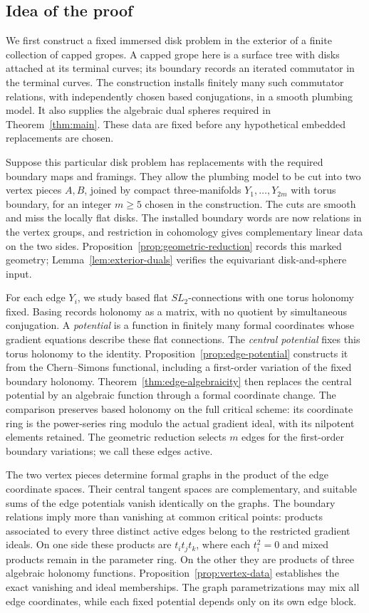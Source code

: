 \subsection{Idea of the proof}

We first construct a fixed immersed disk problem in the exterior of a
finite collection of capped gropes. A capped grope here is a surface tree
with disks attached at its terminal curves; its boundary records an
iterated commutator in the terminal curves. The construction installs
finitely many such commutator relations, with independently chosen based
conjugations, in a smooth plumbing model. It also supplies the algebraic
dual spheres required in Theorem~\ref{thm:main}. These data are fixed
before any hypothetical embedded replacements are chosen.

Suppose this particular disk problem has replacements with the required
boundary maps and framings. They allow the plumbing model to be cut into
two vertex pieces \(A,B\), joined by compact three-manifolds
\(Y_1,\ldots,Y_{2m}\) with torus boundary, for an integer \(m\geq5\)
chosen in the construction. The cuts are smooth and miss
the locally flat disks. The installed boundary words are now relations
in the vertex groups, and restriction in cohomology gives complementary
linear data on the two sides. Proposition~\ref{prop:geometric-reduction}
records this marked geometry; Lemma~\ref{lem:exterior-duals} verifies
the equivariant disk-and-sphere input.

For each edge \(Y_i\), we study based flat \(SL_2\)-connections with one
torus holonomy fixed. Basing records holonomy as a matrix, with no quotient
by simultaneous conjugation. A \emph{potential} is a function in finitely many
formal coordinates whose gradient equations describe these flat
connections. The \emph{central potential} fixes this torus
holonomy to the identity. Proposition~\ref{prop:edge-potential} constructs it from
the Chern--Simons functional, including a first-order variation of the
fixed boundary holonomy. Theorem~\ref{thm:edge-algebraicity} then replaces
the central potential by an algebraic function through a formal
coordinate change. The comparison preserves based holonomy on the full
critical scheme: its coordinate ring is the power-series ring modulo
the actual gradient ideal, with its nilpotent elements retained.
The geometric reduction selects \(m\) edges for the first-order
boundary variations; we call these edges active.

The two vertex pieces determine formal graphs in the product of the edge
coordinate spaces. Their central tangent spaces are complementary, and
suitable sums of the edge potentials vanish identically on the graphs.
The boundary relations imply more than vanishing at common critical
points: products associated to every three distinct active edges belong
to the restricted gradient ideals. On one side these products are
\(t_it_jt_k\), where each \(t_i^2=0\) and mixed products remain in the
parameter ring. On the other they are products of three algebraic
holonomy functions. Proposition~\ref{prop:vertex-data} establishes the
exact vanishing and ideal memberships. The graph parametrizations may
mix all edge coordinates, while each fixed potential depends only on
its own edge block.


